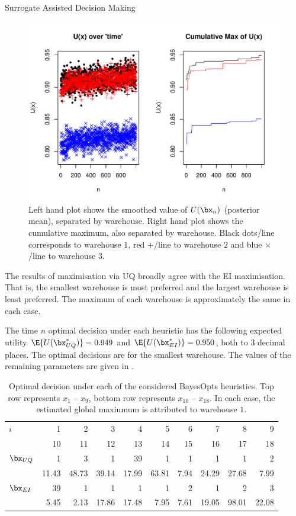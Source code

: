 \begin{chapter}{Surrogate Assisted Decision Making \label{Chap:optimisation}}
\begin{figure}
  \centering
  \includegraphics[width=\textwidth]{fig-optim2/ucb-trace2.pdf}
  \caption{Left hand plot shows the smoothed value of $U(\bx_n)$ (posterior mean), separated by warehouse. Right hand plot shows the cumulative maximum, also separated by warehouse. Black dots/line corresponds to warehouse $1$, red $+$/line to warehouse $2$ and blue $\times$/line to warehouse $3$.}
  \label{Fig:ucb-trace}
\end{figure}


The results of maximisation via UQ broadly agree with the EI maximisation. That is, the smallest warehouse is most preferred and the largest warehouse is least preferred. The maximum of each warehouse is approximately the same in each case.

The time $n$ optimal decision under each heuristic has the following expected utility $\E \{U(\bx^{*}_{UQ})\} = 0.949$ and $\E \{U(\bx^{*}_{EI})\} = 0.950$, both to $3$ decimal places. The optimal decisions are for the smallest warehouse. The values of the remaining parameters are given in .
\begin{table}
  \centering
  \begin{tabular}{lrrrrrrrrr}
    \toprule
    $i$ & 1 &2& 3& 4& 5& 6 &7 &8 &9 \\
    & 10& 11& 12& 13& 14& 15& 16& 17& 18 \\\cmidrule{1-10}
    $\bx_{UQ}$ & 1 & 3 & 1  & 39  & 1 & 1  & 1  & 1  & 2 \\
     & 11.43 & 48.73 & 39.14 & 17.99 & 63.81 & 7.94 & 24.29 & 27.68 & 7.99  \\\cmidrule{1-10}
    $\bx_{EI}$ & 39 & 1 & 1 & 1 & 1 & 2 & 1 & 2 & 3 \\
      &  5.45 & 2.13 & 17.86 & 17.48 & 7.95 & 7.61 & 19.05 & 98.01 & 22.08  \\
    \bottomrule
  \end{tabular}
  \caption{Optimal decision under each of the considered BayesOpts heuristics. Top row represents $x_1$ -- $x_9$, bottom row represents $x_{10}$ -- $x_{18}$. In each case, the estimated global maxiumum is attributed to warehouse $1$.}
  \label{Tab:opt-dec}
\end{table}


\end{chapter}
